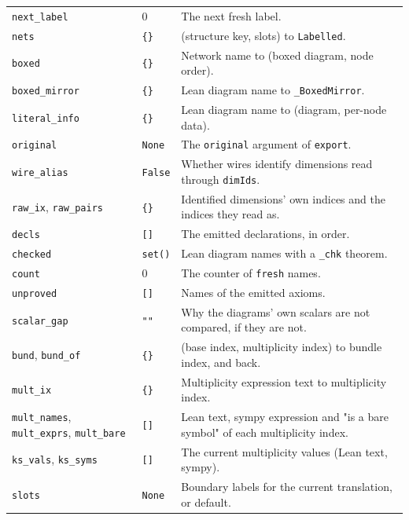 {\begin{xltabular}{\linewidth}{@{}p{3.3cm}p{3.2cm}X@{}}
\texttt{next\_\allowbreak{}label} & 0 & The next fresh label. \\
\texttt{nets} & \texttt{\{\}} & (structure key, slots) to \texttt{Labelled}. \\
\texttt{boxed} & \texttt{\{\}} & Network name to (boxed diagram, node order). \\
\texttt{boxed\_\allowbreak{}mirror} & \texttt{\{\}} & Lean diagram name to \texttt{\_\allowbreak{}BoxedMirror}. \\
\texttt{literal\_\allowbreak{}info} & \texttt{\{\}} & Lean diagram name to (diagram, per-node data). \\
\texttt{original} & \texttt{None} & The \texttt{original} argument of \texttt{export}. \\
\texttt{wire\_\allowbreak{}alias} & \texttt{False} & Whether wires identify dimensions read through \texttt{dimIds}. \\
\texttt{raw\_\allowbreak{}ix}, \texttt{raw\_\allowbreak{}pairs} & \texttt{\{\}} & Identified dimensions' own indices and the indices they read as. \\
\texttt{decls} & \texttt{[]} & The emitted declarations, in order. \\
\texttt{checked} & \texttt{set()} & Lean diagram names with a \texttt{\_\allowbreak{}chk} theorem. \\
\texttt{count} & 0 & The counter of \texttt{fresh} names. \\
\texttt{unproved} & \texttt{[]} & Names of the emitted axioms. \\
\texttt{scalar\_\allowbreak{}gap} & \texttt{""} & Why the diagrams' own scalars are not compared, if they are not. \\
\texttt{bund}, \texttt{bund\_\allowbreak{}of} & \texttt{\{\}} & (base index, multiplicity index) to bundle index, and back. \\
\texttt{mult\_\allowbreak{}ix} & \texttt{\{\}} & Multiplicity expression text to multiplicity index. \\
\texttt{mult\_\allowbreak{}names}, \texttt{mult\_\allowbreak{}exprs}, \texttt{mult\_\allowbreak{}bare} & \texttt{[]} & Lean text, sympy expression and
  "is a bare symbol" of each multiplicity index. \\
\texttt{ks\_\allowbreak{}vals}, \texttt{ks\_\allowbreak{}syms} & \texttt{[]} & The current multiplicity values (Lean text, sympy). \\
\texttt{slots} & \texttt{None} & Boundary labels for the current translation, or default. \\

\end{xltabular}}
